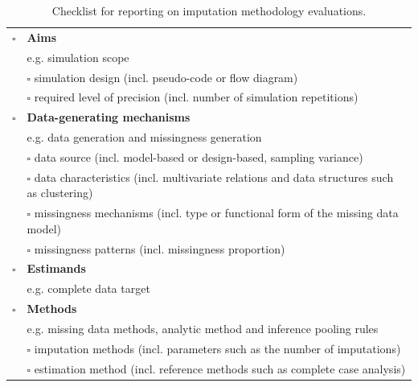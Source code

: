 \documentclass[bimj,fleqn]{w-art}
\begin{document}
\begin{table}[ht!]
\caption{Checklist for reporting on imputation methodology evaluations.}
\label{table:check}
\begin{tabular}{ll}
\hline
$\square$ & \textbf{Aims}                                                                                  \\
  & e.g. simulation scope                                                                          \\ \cline{2-2} 
  & $\square$ simulation design (incl. pseudo-code or flow diagram)                                        \\
  & $\square$ required level of precision (incl. number of simulation   repetitions)                       \\ \hline
$\square$ & \textbf{Data-generating mechanisms}                                                            \\
  & e.g. data generation and missingness generation                                                \\ \cline{2-2} 
  & $\square$ data source (incl. model-based or design-based, sampling   variance)                         \\
  & $\square$ data characteristics (incl. multivariate relations and data   structures such as clustering) \\
  & $\square$ missingness mechanisms (incl. type or functional form of the   missing data model)           \\
  & $\square$ missingness patterns (incl. missingness proportion)                                          \\ \hline
$\square$ & \textbf{Estimands}                                                                             \\
  & e.g. complete data target                                                                      \\ \hline
$\square$ & \textbf{Methods}                                                                               \\
  & e.g. missing data methods, analytic method and inference pooling rules                                    \\ \cline{2-2} 
  & $\square$ imputation methods (incl. parameters such as the number of   imputations)                    \\
  & $\square$ estimation method (incl. reference methods such as complete   case analysis)                 \\

\end{tabular}
\end{table}
\end{document}
